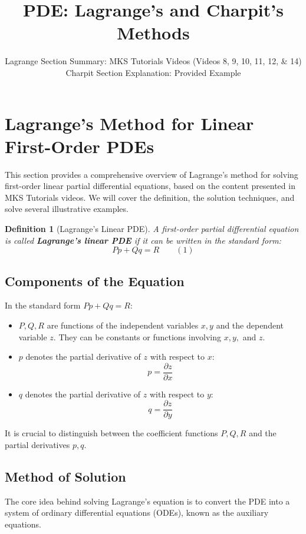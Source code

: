 \documentclass{article}
\title{PDE: Lagrange's and Charpit's Methods}
\author{Lagrange Section Summary: MKS Tutorials Videos (Videos 8, 9, 10, 11, 12, \& 14) \\ Charpit Section Explanation: Provided Example}
\date{} %
\newtheorem{definition}{Definition}[section] %
\theoremstyle{remark}
\begin{document}
	
	\maketitle
	
	\section{Lagrange's Method for Linear First-Order PDEs}
	\label{sec:lagrange}
	
	This section provides a comprehensive overview of Lagrange's method for solving first-order linear partial differential equations, based on the content presented in MKS Tutorials videos. We will cover the definition, the solution techniques, and solve several illustrative examples.
	
	\begin{definition}[Lagrange's Linear PDE]
		A first-order partial differential equation is called \textbf{Lagrange's linear PDE} if it can be written in the standard form:
		\[
		Pp + Qq = R \quad \quad (1)
		\]
	\end{definition}
	
	\subsection{Components of the Equation}
	In the standard form $Pp + Qq = R$:
	\begin{itemize}
		\item $P, Q, R$ are functions of the independent variables $x, y$ and the dependent variable $z$. They can be constants or functions involving $x, y,$ and $z$.
		\item $p$ denotes the partial derivative of $z$ with respect to $x$:
		\[ p = \frac{\partial z}{\partial x} \]
		\item $q$ denotes the partial derivative of $z$ with respect to $y$:
		\[ q = \frac{\partial z}{\partial y} \]
	\end{itemize}
	It is crucial to distinguish between the coefficient functions $P, Q, R$ and the partial derivatives $p, q$.
	
	\subsection{Method of Solution}
	
	The core idea behind solving Lagrange's equation is to convert the PDE into a system of ordinary differential equations (ODEs), known as the auxiliary equations.
	
\end{document}
